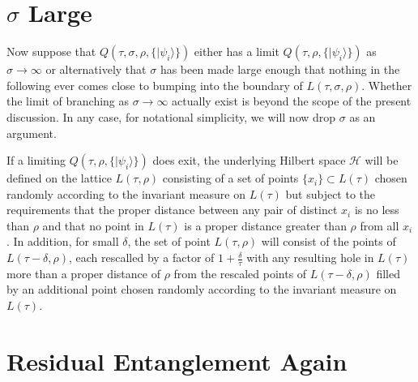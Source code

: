 \documentclass[12pt,amsmath,amssymb,onecolumn]{revtex4-2}
\begin{document}
\section{\label{subsec:sigmainfty} $\sigma$ Large}

Now suppose that $Q(\tau, \sigma, \rho, \{|\psi_i \rangle \})$
either has a limit $Q(\tau, \rho, \{|\psi_i \rangle \})$
as $\sigma \rightarrow \infty$ or alternatively
that $\sigma$ has been made large enough that nothing
in the following ever comes close to bumping into
the boundary of $L( \tau, \sigma, \rho)$.
Whether the limit of branching
as $\sigma \rightarrow \infty$ actually exist is beyond
the scope of the present discussion.
In any case, for notational simplicity, we will now drop $\sigma$
as an argument.

If a limiting $Q(\tau, \rho, \{|\psi_i \rangle \})$ does exit,
the underlying Hilbert space $\mathcal{H}$  will be defined
on the lattice $L( \tau, \rho)$  consisting
of a set of points $\{ x_i \} \subset L(\tau)$ chosen randomly
according to the invariant measure on $L(\tau)$
but subject
to the requirements that the proper distance between
any pair of distinct $x_i$ is no less than $\rho$ and
that no point in $L(\tau)$ is a proper distance greater than
$\rho$ from all $x_i$. In addition, for small $\delta$, the set of point
$L( \tau, \rho)$ will consist of the points of
$L( \tau - \delta, \rho)$, each rescalled by a
factor of $1 + \frac{\delta}{\tau}$ with any
resulting hole in $L(\tau)$ more than a
proper distance of $\rho$ from the rescaled
points of $L( \tau - \delta, \rho)$ 
filled by an additional point chosen randomly
according to the invariant measure on $L(\tau)$.


\section{\label{sec:residualagain} Residual Entanglement Again}
\end{document}
